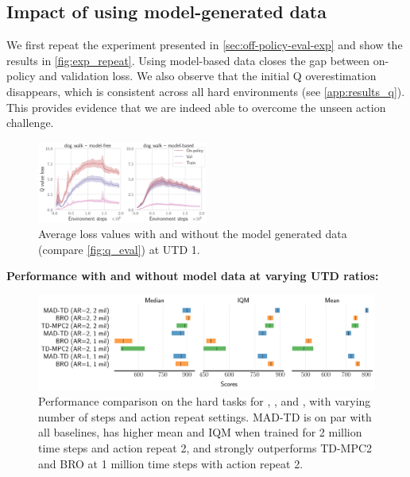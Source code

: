 \subsection{Impact of using model-generated data}

We first repeat the experiment presented in \autoref{sec:off-policy-eval-exp} and show the results in \autoref{fig:exp_repeat}.
Using model-based data closes the gap between on-policy and validation loss.
We also observe that the initial Q overestimation disappears, which is consistent across all hard environments (see \autoref{app:results_q}).
This provides evidence that we are indeed able to overcome the unseen action challenge.

\begin{figure}
    \centering
    \includegraphics[width=0.5\textwidth]{figures/mad-td/critic_loss_dog_walk_model_based_separate.pdf}
    \caption{Average loss values with and without the model generated data (compare \autoref{fig:q_eval}) at UTD 1.}
    \label{fig:exp_repeat}    
\end{figure}
\textbf{Performance with and without model data at varying UTD ratios:}~~~
\begin{figure}[b]
    \centering
    \includegraphics[width=1.\linewidth]{figures/mad-td/hard_rliable_comp.pdf}
    \caption{Performance comparison on the hard tasks for , , and , with varying number of steps and action repeat settings. MAD-TD is on par with all baselines, has higher mean and IQM when trained for 2 million time steps and action repeat 2, and strongly outperforms TD-MPC2 and BRO at 1 million time steps with action repeat 2.}
    \label{fig:comp_baseline}
\end{figure}
